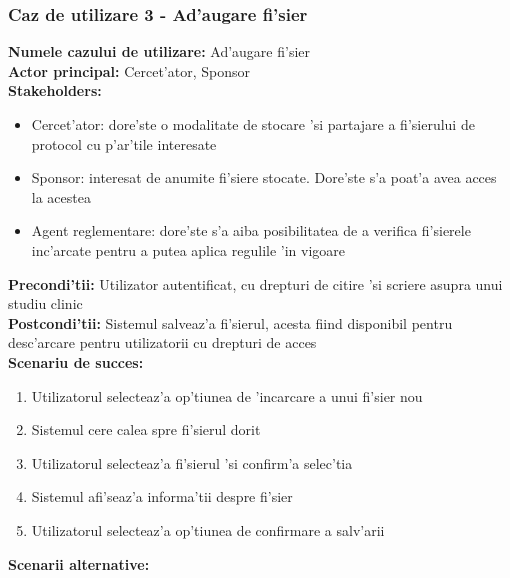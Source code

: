 \documentclass[12pt,a4paper,twoside]{report}
\begin{document}
\subsubsection{Caz de utilizare 3 - Ad'augare fi'sier}
\textbf{Numele cazului de utilizare:} Ad'augare fi'sier\\
\textbf{Actor principal:} Cercet'ator, Sponsor\\
\textbf{Stakeholders:}
\begin{itemize}
    \item Cercet'ator: dore'ste o modalitate de stocare 'si partajare a fi'sierului de protocol cu p'ar'tile interesate
    \item Sponsor: interesat de anumite fi'siere stocate. Dore'ste s'a poat'a avea acces la acestea
    \item Agent reglementare: dore'ste s'a aiba posibilitatea de a verifica fi'sierele inc'arcate pentru a putea aplica regulile 'in vigoare
\end{itemize}
\textbf{Precondi'tii:} Utilizator autentificat, cu drepturi de citire 'si scriere asupra unui studiu clinic\\
\textbf{Postcondi'tii:} Sistemul salveaz'a fi'sierul, acesta fiind disponibil pentru desc'arcare pentru utilizatorii cu drepturi de acces \\
\textbf{Scenariu de succes:} 
\begin{enumerate}
    \item Utilizatorul selecteaz'a op'tiunea de 'incarcare a unui fi'sier nou
    \item Sistemul cere calea spre fi'sierul dorit
    \item Utilizatorul selecteaz'a fi'sierul 'si confirm'a selec'tia
    \item Sistemul afi'seaz'a informa'tii despre fi'sier
    \item Utilizatorul selecteaz'a op'tiunea de confirmare a salv'arii
\end{enumerate}
\textbf{Scenarii alternative:}
\end{document}
